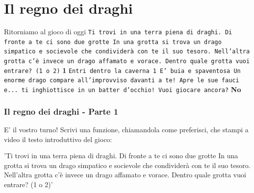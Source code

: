 \documentclass{beamer}
\begin{document}
\section{Il regno dei draghi}

\begin{frame}{Ritorniamo al gioco di oggi}
\texttt{Ti trovi in una terra piena di draghi.\newline
        Di fronte a te ci sono due grotte\newline
        In una grotta si trova un drago simpatico e socievole che condividerà con te il suo tesoro.\newline
        Nell'altra grotta c'è invece un drago affamato e vorace.\newline
        Dentro quale grotta vuoi entrare? (1 o 2)\newline}
\textbf{1\newline}
\texttt{Entri dentro la caverna 1\newline
        E' buia e spaventosa\newline
        Un enorme drago compare all'improvviso davanti a te! Apre le sue fauci e... ti inghiottisce in un batter d'occhio!\newline
        Vuoi giocare ancora?\newline}
\textbf{No}        
        
\end{frame}

\begin{frame}[fragile]
\frametitle{Il regno dei draghi - Parte 1}

\begin{block}{E' il vostro turno!}
Scrivi una funzione, chiamandola come preferisci, che stampi a video il testo introduttivo del gioco:\newline
        
        'Ti trovi in una terra piena di draghi.\newline
        Di fronte a te ci sono due grotte\newline
        In una grotta si trova un drago simpatico e socievole che condividerà con te il suo tesoro.\newline
        Nell'altra grotta c'è invece un drago affamato e vorace.\newline
        Dentro quale grotta vuoi entrare? (1 o 2)'
\end{block}

\end{frame}
\end{document}
